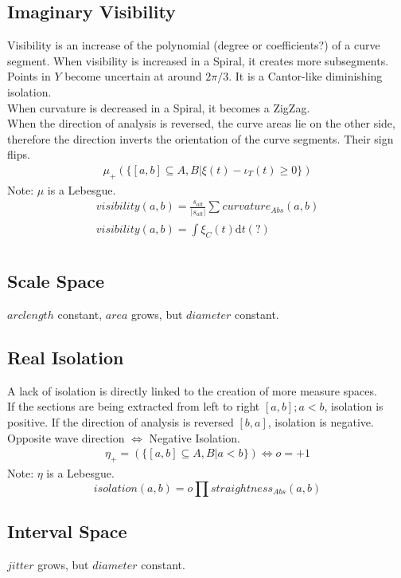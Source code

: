\documentclass{report}
\begin{document}
\subsection{Imaginary Visibility}
Visibility is an increase of the polynomial (degree or coefficients?) of a curve segment.
When visibility is increased in a Spiral, it creates more subsegments. Points in $Y$ become uncertain at around $2\pi/3$. It is a Cantor-like diminishing isolation.\\
When curvature is decreased in a Spiral, it becomes a ZigZag.\\
When the direction of analysis is reversed, the curve areas lie on the other side, therefore the direction inverts the orientation of the curve segments. Their sign flips.
\begin{align}
\mu_{+}(\{[a,b] \subseteq A,B \vert \xi(t) -\iota_{T}(t)\geq0\})
\end{align}
Note: $\mu$ is a Lebesgue.
\begin{align}
visibility(a,b)=\frac{s_{alt}}{\lvert s_{alt} \rvert} \sum_{}^{} curvature_{Abs}(a,b)\\
visibility(a,b)= \int \limits _{}^{}\xi_{C}(t)\mathrm{d}t(?)
\end{align}
\subsection*{Scale Space}
$arclength$ constant, $area$ grows, but $diameter$ constant.

\subsection{Real Isolation}
A lack of isolation is directly linked to the creation of more measure spaces.\\
If the sections are being extracted from left to right $[a,b];a<b$, isolation is positive. If the direction of analysis is reversed $[b,a]$, isolation is negative.\\
Opposite wave direction $\Leftrightarrow$ Negative Isolation.
\begin{align}
\eta_{+}=(\{[a,b] \subseteq A,B \vert a<b\}) \Leftrightarrow o=+1
\end{align}
Note: $\eta$ is a Lebesgue.
\begin{equation}
isolation(a,b)=o \prod straightness_{Abs}(a,b)
\end{equation}
\subsection*{Interval Space}
$jitter$ grows, but $diameter$ constant.
\end{document}
